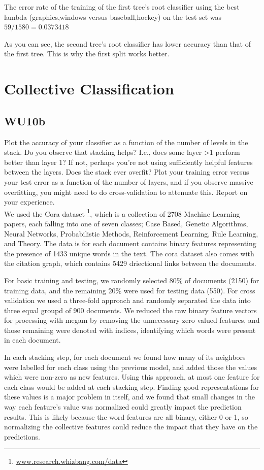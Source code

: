\documentclass[a4paper,11pt]{article}
\begin{document}
The error rate of the training of the first tree's root classifier
using the best lambda ({graphics,windows}
versus {baseball,hockey}) on the test set was $59 / 1580 = 0.0373418$

As you can see, the second tree's root classifier has lower accuracy
than that of the first tree. This is why the first split works better.

\pagebreak
\section{Collective Classification}
\subsection{WU10b}
\textsf{Plot the accuracy of your classifier as a function
  of the number of levels in the stack. Do you observe that stacking
  helps? I.e., does some layer >1 perform better than layer 1? If not,
  perhaps you're not using sufficiently helpful features between the
  layers. Does the stack ever overfit? Plot your training error versus
  your test error as a function of the number of layers, and if you
  observe massive overfitting, you might need to do cross-validation
  to attenuate this. Report on your experience.}\\

We used the Cora dataset \footnote{\url{www.research.whizbang.com/data}}, which is a collection of
2708 Machine Learning papers, each falling into one of seven
classes; Case Based, Genetic Algorithms, Neural Networks,
Probabilistic Methods, Reinforcement Learning, Rule Learning,
and Theory. The data is for each document contains binary features representing
the presence of 1433 unique words in the text. The cora dataset 
also comes with the citation graph, 
which contains 5429 driectional links between the documents.

For basic training and testing, we randomly selected 80\% of documents (2150) 
for training data, and the remaining 20\% were used for testing data (550).
For cross validation we used a three-fold approach and randomly separated 
the data into three equal groupd of 900 documents. 
We reduced the raw binary feature vectors for processing with megam
by removing the unnecessary zero valued features, and those remaining 
were denoted with indices, identifying which words were present in each document.

In each stacking step, for each document we found how many of its
neighbors were labelled for each class using the previous model, and added 
those the values which were non-zero as new features. Using this approach,
at most one feature for each class would be added at each stacking step.
Finding good representations for these values is a major problem in itself,
and we found that small changes in the way each feature's value was normalized
could greatly impact the prediction results. This is likely because the word
features are all binary, either 0 or 1, so normalizing the collective features
could reduce the impact that they have on the predictions.
\end{document}
